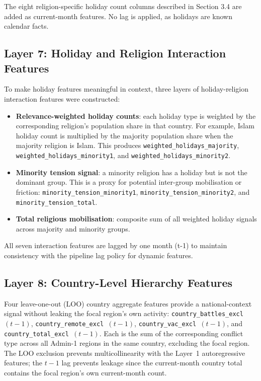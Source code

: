 \documentclass[12pt,a4paper]{article}
\begin{document}
The eight religion-specific holiday count columns described in Section
3.4 are added as current-month features. No lag is applied, as holidays
are known calendar facts.

\subsection{Layer 7: Holiday and Religion Interaction Features}

To make holiday features meaningful in context, three layers of
holiday-religion interaction features were constructed:

\begin{itemize}
    \item \textbf{Relevance-weighted holiday counts}: each holiday type
          is weighted by the corresponding religion's population share
          in that country. For example, Islam holiday count is multiplied
          by the majority population share when the majority religion is
          Islam. This produces \texttt{weighted\_holidays\_majority},
          \texttt{weighted\_holidays\_minority1}, and
          \texttt{weighted\_holidays\_minority2}.
    \item \textbf{Minority tension signal}: a minority religion has a
          holiday but is not the dominant group. This is a proxy for
          potential inter-group mobilisation or friction:
          \texttt{minority\_tension\_minority1},
          \texttt{minority\_tension\_minority2}, and
          \texttt{minority\_tension\_total}.
    \item \textbf{Total religious mobilisation}: composite sum of all
          weighted holiday signals across majority and minority groups.
\end{itemize}

All seven interaction features are lagged by one month (t-1) to maintain
consistency with the pipeline lag policy for dynamic features.

\subsection{Layer 8: Country-Level Hierarchy Features}

Four leave-one-out (LOO) country aggregate features provide a
national-context signal without leaking the focal region's own
activity: \texttt{country\_battles\_excl~$(t-1)$},
\texttt{country\_remote\_excl~$(t-1)$},
\texttt{country\_vac\_excl~$(t-1)$}, and
\texttt{country\_total\_excl~$(t-1)$}. Each is the sum of the
corresponding conflict type across all Admin-1 regions in the same
country, excluding the focal region. The LOO exclusion prevents
multicollinearity with the Layer~1 autoregressive features; the
$t-1$ lag prevents leakage since the current-month country total
contains the focal region's own current-month count.
\end{document}
